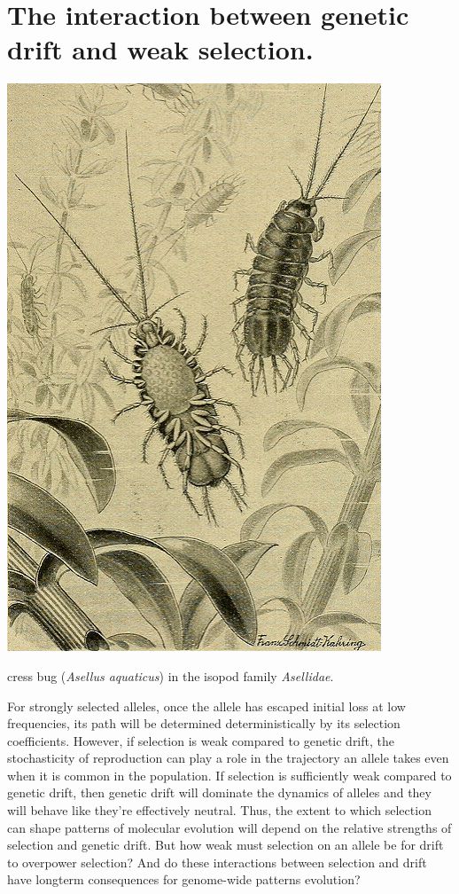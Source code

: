 {\section{The interaction between genetic drift and weak selection.}
 \begin{marginfigure}
 \begin{center}
 \includegraphics[width=0.7 \textwidth]{illustration_images/Genetic_drift_selection/Isopod_Asellidae/20406697312_1a9aa75024_z.jpg}
 \end{center}
 \caption{cress bug ({\it Asellus aquaticus}) in the isopod family
   {\it Asellidae}. } \label{fig: asellid_isopod}
 \end{marginfigure}
For strongly selected alleles, once the allele has escaped initial
loss at low frequencies, its path will be determined deterministically by its
selection coefficients. However, if selection is weak compared to
genetic drift, the stochasticity of reproduction can play a role in the trajectory an
allele takes even when it is common in the population. If selection is
sufficiently weak compared to genetic drift, then genetic drift will dominate the dynamics of alleles
and they will behave like they're effectively neutral. Thus, the extent
to which selection can shape patterns of molecular evolution will
depend on the relative strengths of selection and genetic drift.
But how weak must selection on an allele be for drift to overpower
selection? And do these interactions between selection and drift have longterm consequences for genome-wide patterns evolution?

}
